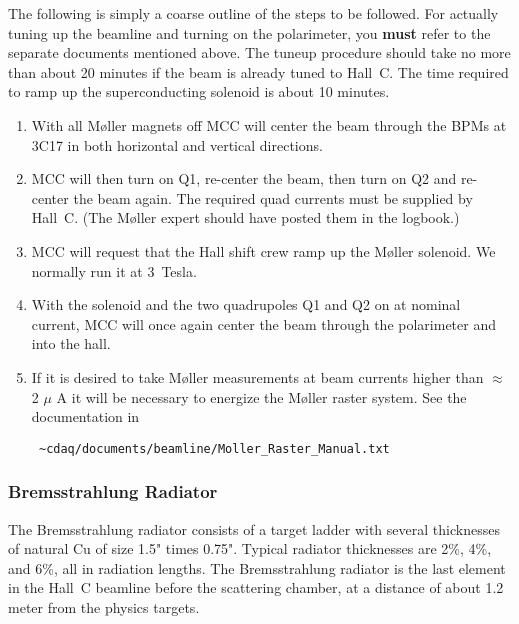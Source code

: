 The following is simply a coarse outline of the steps to be followed.
For actually tuning up the beamline and turning on the polarimeter, you {\bf must}
refer to the separate documents mentioned above. The tuneup procedure should take no
more than about 20 minutes if the beam is already tuned to Hall~C.
The time required to ramp up the superconducting solenoid is about 10 minutes.
\begin{enumerate}
        \item With all M\o ller magnets off MCC will
           center  the beam through the BPMs at 3C17  in both
           horizontal  and vertical  directions. 

        \item MCC will then turn on Q1, re-center the beam, then turn
	on Q2 and re-center the beam again. The required quad currents
	must be supplied by Hall~C.  (The M\o ller expert should have
	posted them in the logbook.)

        \item MCC will request that the Hall shift crew ramp up the
	M\o ller solenoid. We normally run it at 3~Tesla.

        \item With the solenoid and the two quadrupoles Q1 and Q2 on
              at nominal current, MCC will once again center the beam
              through the polarimeter and into the hall.

	\item If it is desired to take M\o ller measurements at beam currents
	      higher than $\approx$ 2 $\mu$ A it will be necessary to energize
	      the M\o ller raster system. See the documentation in
              \begin{verbatim} ~cdaq/documents/beamline/Moller_Raster_Manual.txt \end{verbatim}
\end{enumerate}


\subsubsection{Bremsstrahlung Radiator}

The Bremsstrahlung radiator consists of a target ladder with
several thicknesses of natural Cu of size 1.5" times 0.75".
Typical radiator thicknesses are 2\%, 4\%, and 6\%, all in
radiation lengths. The Bremsstrahlung radiator is the last element
in the Hall~C beamline before the scattering chamber, at a distance
of about 1.2 meter from the physics targets.

